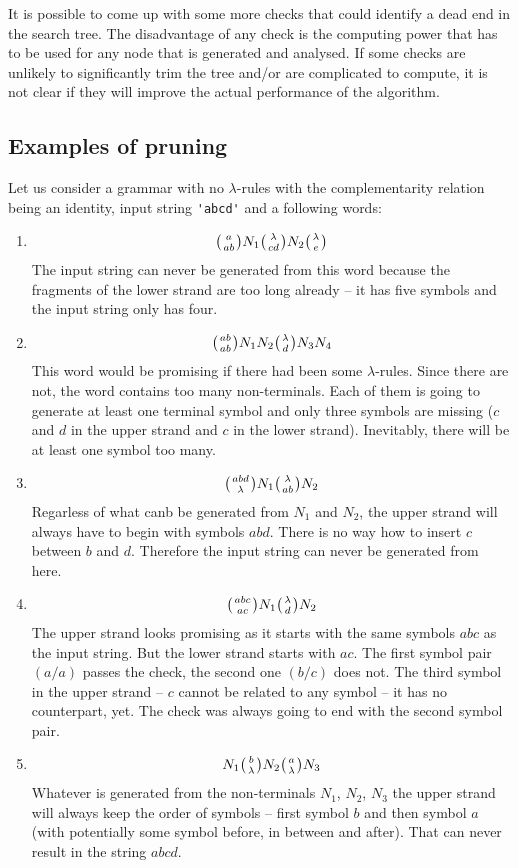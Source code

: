 It is possible to come up with some more checks that could identify a dead end in the search tree. The disadvantage of any check is the computing power that has to be used for any node that is generated and analysed. If some checks are unlikely to significantly trim the tree and/or are complicated to compute, it is not clear if they will improve the actual performance of the algorithm.

\subsection{Examples of pruning}
Let us consider a grammar with no $\lambda$-rules with the complementarity relation being an identity, input string \verb/'abcd'/  and a following words:

\begin{enumerate}
\item{
$$\wkpair{a}{ab} N_1 \wkpair{\lambda}{cd} N_2 \wkpair{\lambda}{e}$$
The input string can never be generated from this word because the fragments of the lower strand are too long already -- it has five symbols and the input string only has four.
}
\item{
$$\wkpair{ab}{ab} N_1 N_2 \wkpair{\lambda}{d} N_3 N_4$$
This word would be promising if there had been some $\lambda$-rules. Since there are not, the word contains too many non-terminals. Each of them is going to generate at least one terminal symbol and only three symbols are missing ($c$ and $d$ in the upper strand and $c$ in the lower strand). Inevitably, there will be at least one symbol too many.
}
\item{
$$\wkpair{abd}{\lambda} N_1 \wkpair{\lambda}{ab} N_2$$
Regarless of what canb be generated from $N_1$ and $N_2$, the upper strand will always have to begin with symbols $abd$. There is no way how to insert $c$ between $b$ and $d$. Therefore the input string can never be generated from here.
}
\item{
$$\wkpair{abc}{ac} N_1 \wkpair{\lambda}{d} N_2$$
The upper strand looks promising as it starts with the same symbols $abc$ as the input string. But the lower strand starts with $ac$. The first symbol pair $(a/a)$ passes the check, the second one $(b/c)$ does not. The third symbol in the upper strand -- $c$ cannot be related to any symbol -- it has no counterpart, yet. The check was always going to end with the second symbol pair.
}
\item{
$$N_1 \wkpair{b}{\lambda} N_2 \wkpair{a}{\lambda} N_3$$
Whatever is generated from the non-terminals $N_1$, $N_2$, $N_3$ the upper strand will always keep the order of symbols -- first symbol $b$ and then symbol $a$ (with potentially some symbol before, in between and after). That can never result in the string $abcd$.
}


\end{enumerate}
